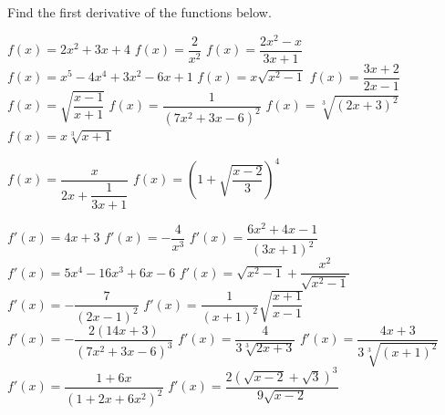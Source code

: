 \begin{Exercise} Find the first derivative of the functions below.
	\begin{multicols}{2}
	\ifcalculus
	\Question[difficulty = 1] $f(x)=2x^2+3x+4$
	\Question[difficulty = 1] $f(x)=\dfrac{2}{x^2}$
	\Question[difficulty = 1] $f(x)=\dfrac{2x^2-x}{3x+1}$
	\fi
	\Question[difficulty = 1] $f(x)=x^5-4x^4+3x^2-6x+1$
	\Question[difficulty = 1] $f(x)=x\sqrt{x^2-1} $
	\Question[difficulty = 1] $f(x)=\dfrac{3x+2}{2x-1}$
	\ifanalysis\Question[difficulty = 1]\fi\ifcalculus\Question[difficulty = 2]\fi $f(x)=\sqrt{\dfrac{x-1}{x+1}}   $
	\Question[difficulty = 1] $f(x)=\dfrac{1}{(7x^2+3x-6)^2} $
	\Question[difficulty = 1] $f(x)=\sqrt[3]{(2x+3)^2} $
	\Question[difficulty = 1] $f(x)=x\sqrt[3]{x+1} $
	
	\Question[difficulty = 2] $f(x) = \dfrac{x}{2x+ \dfrac{1}{3x+1}} $ %
	\ifanalysis\Question[difficulty = 1]\fi\ifcalculus\Question[difficulty = 2]\fi $f(x) = \left(1 + \sqrt{\dfrac{x-2}{3}} \right)^4$ 

	\EndCurrentQuestion
	\end{multicols}

\end{Exercise}

\begin{Answer}\phantom{}
    \begin{multicols}{2}
		
			\ifcalculus
	        \Question $f'(x)=4x+3$
	        \Question $f'(x)=-\dfrac{4}{x^3}$
	        \Question $f'(x)=\dfrac{6x^2+4x-1}{(3x+1)^2}$
	        \fi
			\Question $f'(x) = 5x^4-16x^3+6x-6$
			\Question $f'(x) =\sqrt{x^2-1}+\dfrac{x^2}{\sqrt{x^2-1}}$
			\Question $f'(x) =-\dfrac{7}{(2x-1)^2}$
			\Question $f'(x) =\dfrac{1}{(x+1)^2}\sqrt{\dfrac{x+1}{x-1}}$
			\Question $f'(x) =-\dfrac{2(14x+3)}{(7x^2+3x-6)^3}$
			\Question $f'(x) =\dfrac{4}{3\sqrt[3]{2x+3}}$
			\Question $f'(x) =\dfrac{4x+3}{3\sqrt[3]{(x+1)^2}}$
			\Question $f'(x) =\dfrac{1 + 6x}{(1 + 2 x + 6 x^2)^2} $ 
			\Question $f'(x) =\dfrac{2 (\sqrt{x-2} + \sqrt{3})^3}{9 \sqrt{x-2} }$ 
		\EndCurrentQuestion
	\end{multicols}
\end{Answer}	

	
